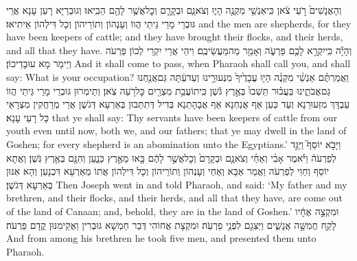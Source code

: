 {וְהָאֲנָשִׁים֙ רֹ֣עֵי צֹ֔אן כִּֽי\maqqaf אַנְשֵׁ֥י מִקְנֶ֖ה הָי֑וּ וְצֹאנָ֧ם וּבְקָרָ֛ם וְכׇל\maqqaf אֲשֶׁ֥ר לָהֶ֖ם הֵבִֽיאוּ׃}
{וְגוּבְרַיָּא רָעַן עָנָא אֲרֵי גּוּבְרֵי מָרֵי גֵּיתֵי הֲווֹ וְעָנְהוֹן וְתוֹרֵיהוֹן וְכָל דִּילְהוֹן אֵיתִיאוּ׃}
{and the men are shepherds, for they have been keepers of cattle; and they have brought their flocks, and their herds, and all that they have.}{}
{וְהָיָ֕ה כִּֽי\maqqaf יִקְרָ֥א לָכֶ֖ם פַּרְעֹ֑ה וְאָמַ֖ר מַה\maqqaf מַּעֲשֵׂיכֶֽם׃}
{וִיהֵי אֲרֵי יִקְרֵי לְכוֹן פַּרְעֹה וְיֵימַר מָא עוּבָדֵיכוֹן׃}
{And it shall come to pass, when Pharaoh shall call you, and shall say: What is your occupation?}{}
{וַאֲמַרְתֶּ֗ם אַנְשֵׁ֨י מִקְנֶ֜ה הָי֤וּ עֲבָדֶ֙יךָ֙ מִנְּעוּרֵ֣ינוּ וְעַד\maqqaf עַ֔תָּה גַּם\maqqaf אֲנַ֖חְנוּ גַּם\maqqaf אֲבֹתֵ֑ינוּ בַּעֲב֗וּר תֵּשְׁבוּ֙ בְּאֶ֣רֶץ גֹּ֔שֶׁן כִּֽי\maqqaf תוֹעֲבַ֥ת מִצְרַ֖יִם כׇּל\maqqaf רֹ֥עֵה צֹֽאן׃}
{וְתֵימְרוּן גּוּבְרֵי מָרֵי גֵּיתֵי הֲווֹ עַבְדָּךְ מִזְּעוּרַנָא וְעַד כְּעַן אַף אֲנַחְנָא אַף אֲבָהָתַנָא בְּדִיל דְּתִתְּבוּן בְּאַרְעָא דְּגֹשֶׁן אֲרֵי מְרַחֲקִין מִצְרָאֵי כָּל רָעֵי עָנָא׃}
{that ye shall say: Thy servants have been keepers of cattle from our youth even until now, both we, and our fathers; that ye may dwell in the land of Goshen; for every shepherd is an abomination unto the Egyptians.’}{}
\newperek
{}%
{וַיָּבֹ֣א יוֹסֵף֮ וַיַּגֵּ֣ד לְפַרְעֹה֒ וַיֹּ֗אמֶר אָבִ֨י וְאַחַ֜י וְצֹאנָ֤ם וּבְקָרָם֙ וְכׇל\maqqaf אֲשֶׁ֣ר לָהֶ֔ם בָּ֖אוּ מֵאֶ֣רֶץ כְּנָ֑עַן וְהִנָּ֖ם בְּאֶ֥רֶץ גֹּֽשֶׁן׃}
{וַאֲתָא יוֹסֵף וְחַוִּי לְפַרְעֹה וַאֲמַר אַבָּא וְאַחַי וְעָנְהוֹן וְתוֹרֵיהוֹן וְכָל דִּילְהוֹן אֲתוֹ מֵאַרְעָא דִּכְנָעַן וְהָא אִנּוּן בְּאַרְעָא דְּגֹשֶׁן׃}
{Then Joseph went in and told Pharaoh, and said: ‘My father and my brethren, and their flocks, and their herds, and all that they have, are come out of the land of Canaan; and, behold, they are in the land of Goshen.’}{}
{וּמִקְצֵ֣ה אֶחָ֔יו לָקַ֖ח חֲמִשָּׁ֣ה אֲנָשִׁ֑ים וַיַּצִּגֵ֖ם לִפְנֵ֥י פַרְעֹֽה׃}
{וּמִקְצָת אֲחוֹהִי דְּבַר חַמְשָׁא גּוּבְרִין וַאֲקֵימִנּוּן קֳדָם פַּרְעֹה׃}
{And from among his brethren he took five men, and presented them unto Pharaoh.}{}
